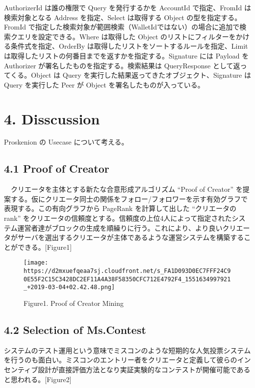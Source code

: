 AuthorizerId は誰の権限で Query を発行するかを AccountId で指定、FromId
は検索対象となる Address を指定、Select は取得する Object
の型を指定する。FromId
で指定した検索対象が範囲検索（WalletIdではない）の場合に追加で検索クエリを設定できる。Where
は取得した Object のリストにフィルターをかける条件式を指定、OrderBy
は取得したリストをソートするルールを指定、Limit
は取得したリストの何番目までを返すかを指定する。Signature には Payload
を Authorizer が署名したものを指定する。検索結果は QueryResponse
として返ってくる。Object は Query
を実行した結果返ってきたオブジェクト、Signature は Query を実行した Peer
が Object を署名したものが入っている。

\hypertarget{disscussion}{%
\section{4. Disscussion}\label{disscussion}}

Proskenion の Usecase について考える。

\hypertarget{proof-of-creator}{%
\subsection{4.1 Proof of Creator}\label{proof-of-creator}}

　クリエータを主体とする新たな合意形成アルゴリズム ``Proof of Creator''
を提案する。仮にクリエータ同士の関係をフォロー/フォロワーを示す有効グラフで表現する。この有向グラフから
PageRank を計算して出した ``クリエータのrank''
をクリエータの信頼度とする。信頼度の上位4人によって指定されたシステム運営者達がブロックの生成を順繰りに行う。これにより、より良いクリエータがサーバを選出するクリエータが主体であるような運営システムを構築することができる。{[}Figure1{]}

\begin{figure}
\centering
\texttt{[image: https://d2mxuefqeaa7sj.cloudfront.net/s\_FA1D093D0EC7FFF24C90E55F2C15C3428DC2EF11A4A38F58350CFC712E4792F4\_1551634997921\_+2019-03-04+02.42.48.png]}
\caption{Figure1. Proof of Creator Mining}
\end{figure}

\hypertarget{selection-of-ms.contest}{%
\subsection{4.2 Selection of Ms.Contest}\label{selection-of-ms.contest}}

システムのテスト運用という意味でミスコンのような短期的な人気投票システムを行うのも面白い。ミスコンのエントリー者をクリエータと定義して彼らのインセンティブ設計が直接評価方法となり実証実験的なコンテストが開催可能であると思われる。{[}Figure2{]}

